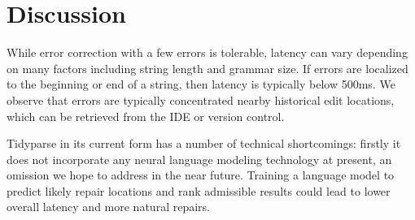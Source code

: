 \documentclass[sigplan,review,anonymous,acmsmall]{acmart}\settopmatter{printfolios=false,printccs=false,printacmref=false}
\begin{document}
%
%
%
%
%
%

\section{Discussion}\label{sec:discussion}

While error correction with a few errors is tolerable, latency can vary depending on many factors including string length and grammar size. If errors are localized to the beginning or end of a string, then latency is typically below 500ms. We observe that errors are typically concentrated nearby historical edit locations, which can be retrieved from the IDE or version control.

Tidyparse in its current form has a number of technical shortcomings: firstly it does not incorporate any neural language modeling technology at present, an omission we hope to address in the near future. Training a language model to predict likely repair locations and rank admissible results could lead to lower overall latency and more natural repairs.
\end{document}
